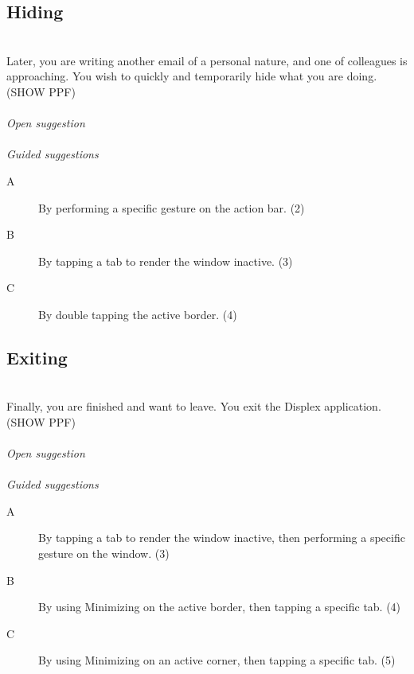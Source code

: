 \subsection{Hiding}
\hfill\\
Later, you are writing another email of a personal nature, and one of colleagues is approaching. You wish to quickly and temporarily hide what you are doing.
(SHOW PPF)
\\\\
\emph{Open suggestion}
\\\\
\emph{Guided suggestions}
\begin{description}
\item[A]{By performing a specific gesture on the action bar. (2)}
\item[B]{By tapping a tab to render the window inactive. (3)}
\item[C]{By double tapping the active border. (4)}
\end{description}


\subsection{Exiting}
\hfill\\
Finally, you are finished and want to leave. You exit the Displex application.
(SHOW PPF)
\\\\
\emph{Open suggestion}
\\\\
\emph{Guided suggestions}
\begin{description}
\item[A]{By tapping a tab to render the window inactive, then performing a specific gesture on the window. (3)}
\item[B]{By using Minimizing on the active border, then tapping a specific tab. (4)}
\item[C]{By using Minimizing on an active corner, then tapping a specific tab. (5)}
\end{description}

  
